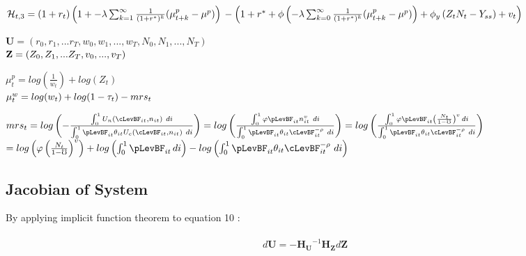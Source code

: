 \documentclass[titlepage]{\econtex}\providecommand{\texname}{BufferStockTheory}
\begin{document}
$ \mathcal{H}_{t,3}  =  (1+r_{t}) \left(1+ -\lambda \sum_{k=1}^{\infty} \frac{1}{(1+r^{*})^{k}} ( \mu_{t+k}^{p} - \mu^{p}) \right) \\ \\
 - \left(1+r^{*}+ \phi \left(- \lambda \sum_{k=0}^{\infty} \frac{1}{(1+r^{*})^{k}} ( \mu_{t+k}^{p} - \mu^{p}) \right) +\phi_{y} \left(Z_{t} N_{t} - Y_{ss} \right) + v_{t}\right) \\ \\ $
 
$\mathbf{U} = (r_{0} , r_{1} , ...r_{T}, w_{0}, w_{1}, ..., w_{T}, N_{0}, N_{1},...,N_{T})$ \\ 

$ \mathbf{Z} = ( Z_{0}, Z_{1},... Z_{T}, v_{0},...,v_{T}) \\ \\ $ 

$ \mu_{t}^{p} = log(\frac{1}{w_{t}}) + log(Z_{t})$ \\ 

$\mu_{t}^{w} = log(w_{t}) + log(1 - \tau_{t}) - mrs_{t} \\ \\ $


$mrs_{t} = log \left(- \frac{\int_{0}^{1}   U_{n} \left(\cLevBF_{i t}, n_{i t} \right) \ d i  }{\int_{0}^{1} \pLevBF_{it} \theta_{it} U_{c} \left(\cLevBF_{i t}, n_{i t} \right) \  di } \right) = log \left(\frac{\int_{0}^{1} \varphi \pLevBF_{it} n_{it}^{v} \ d i  }{\int_{0}^{1} \pLevBF_{it}  \theta_{it} \cLevBF_{it}^{-\rho} \  di } \right) = log \left(\frac{\int_{0}^{1} \varphi \pLevBF_{it} \left(\frac{N_{t}}{1 - \mho} \right)^{v} \, d i  }{\int_{0}^{1} \pLevBF_{it}  \theta_{it} \cLevBF_{it}^{-\rho} \  di } \right)$ \\ 

$ = log \left( \varphi \left(\frac{N_{t}}{1 - \mho}\right) ^{v}\right) + log \left(\int_{0}^{1} \pLevBF_{it}  \,  di  \right) - log \left(\int_{0}^{1} \pLevBF_{it}  \theta_{it} \cLevBF_{it}^{-\rho} \  di  \right) $


\hypertarget{Jacobian of System}{}
\subsection{Jacobian of System} 

By applying implicit function theorem to equation 10 : \\ \\

$$d\mathbf{U} =  -{\mathbf{H}_{\mathbf{U}}}^{-1} \mathbf{H}_{\mathbf{Z}} d \mathbf{Z}$$ \\ 
\end{document}

